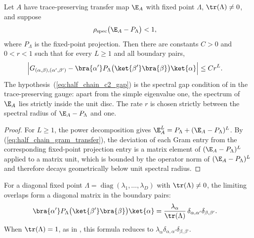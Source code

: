 \begin{lemma}%
    \label{thm:half_chain_gram_geometric}
    \leanok
    Let $A$ have trace-preserving transfer map $\E_A$ with fixed point
    $\Lambda$, $\tr(\Lambda)\neq0$, and suppose
    \begin{align}
        \rho_{\mathrm{spec}}\bigl(\E_A-P_{\Lambda}\bigr) & <1,
        \label{eq:half_chain_c2_gap}
    \end{align}
    where $P_{\Lambda}$ is the fixed-point projection. Then there are
    constants $C>0$ and $0<r<1$ such that for every $L\geq1$ and all boundary
    pairs,
    \begin{align}
        \Bigl|
        G_{(\alpha,\beta),(\alpha',\beta')}
        -\bra{\alpha'}P_{\Lambda}
        \bigl(\ket{\beta'}\bra{\beta}\bigr)\ket{\alpha}
        \Bigr|
         & \leq C r^{L}.
        \label{eq:half_chain_gram_geometric}
    \end{align}
    The hypothesis~(\ref{eq:half_chain_c2_gap}) is the spectral gap condition
    of \cite[Theorem~6]{PerezGarcia2007Matrix} in the trace-preserving gauge:
    apart from the simple eigenvalue one, the spectrum of $\E_A$ lies
    strictly inside the unit disc. The rate $r$ is chosen strictly between the
    spectral radius of $\E_A-P_{\Lambda}$ and one.
\end{lemma}

\begin{proof}
    \leanok
    For $L\geq1$, the power decomposition gives
    $\E_A^{L}=P_{\Lambda}+(\E_A-P_{\Lambda})^{L}$. By (\ref{eq:half_chain_gram_transfer}),
    the deviation of each Gram entry from the corresponding fixed-point projection
    entry is a matrix element of $(\E_A-P_{\Lambda})^{L}$ applied to a matrix unit,
    which is bounded by the operator norm of $(\E_A-P_{\Lambda})^{L}$ and therefore
    decays geometrically below unit spectral radius.
\end{proof}

\begin{lemma}%
    \label{lem:half_chain_gram_limit_diagonal}
    \leanok
    For a diagonal fixed point
    $\Lambda=\operatorname{diag}(\lambda_1,\ldots,\lambda_D)$ with
    $\tr(\Lambda)\neq0$, the limiting overlaps form a diagonal matrix in the
    boundary pairs:
    \begin{align}
        \bra{\alpha'}P_{\Lambda}
        \bigl(\ket{\beta'}\bra{\beta}\bigr)\ket{\alpha}
         & =\frac{\lambda_\alpha}{\tr(\Lambda)}\,
        \delta_{\alpha,\alpha'}\delta_{\beta,\beta'}.
        \label{eq:half_chain_limit_diagonal}
    \end{align}
    When $\tr(\Lambda)=1$, as in \cite{PerezGarcia2007Matrix}, this formula reduces
    to $\lambda_\alpha\delta_{\alpha,\alpha'}\delta_{\beta,\beta'}$.
\end{lemma}

